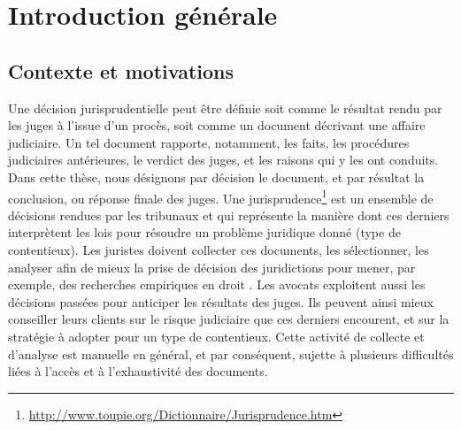 \chapter*{Introduction générale}
\label{chap:intro}

\section{Contexte et motivations}
\label{sec:intro:contexte}
Une décision jurisprudentielle peut être définie soit comme  le résultat rendu par les juges à l'issue d'un procès, soit comme un document décrivant une affaire judiciaire. Un tel document rapporte, notamment,  les faits, les procédures judiciaires antérieures, le verdict des juges, et les raisons qui y les ont conduits. Dans cette thèse, nous désignons par \og décision \fg{} le document, et par  \og résultat\fg{} la conclusion, ou réponse finale des juges. Une jurisprudence\footnote{\url{http://www.toupie.org/Dictionnaire/Jurisprudence.htm}} est un ensemble de décisions rendues par les tribunaux et qui représente la manière dont ces derniers interprètent les lois pour résoudre un problème juridique donné (type de contentieux). Les juristes doivent collecter ces documents, les sélectionner, les analyser afin de  mieux la prise de décision des juridictions pour mener, par exemple, des recherches empiriques en droit \citep{ancel2003expulsion, jeandidier2006pensions}. Les avocats exploitent aussi les décisions passées pour anticiper les résultats des juges. Ils peuvent ainsi mieux conseiller leurs clients sur le risque judiciaire que ces derniers encourent, et sur la stratégie à adopter pour un type de contentieux. Cette activité de collecte et d'analyse est manuelle en général, et par conséquent, sujette à plusieurs difficultés liées à l'accès et à l'exhaustivité des documents. 

